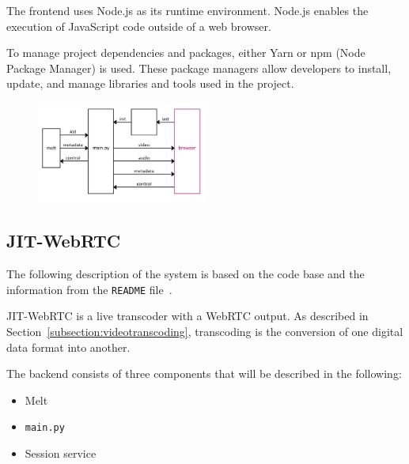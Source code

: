 \documentclass[12pt,a4paper]{article}
\begin{document}
The frontend uses Node.js as its runtime environment. Node.js enables the execution of JavaScript code outside of a web browser.~\cite{nodejs, RM_Frontend, ap3_docs}

To manage project dependencies and packages, either Yarn or npm (Node Package Manager) is used. These package managers allow developers to install, update, and manage libraries and tools used in the project.~\cite{RM_Frontend, npmyarn}


\begin{figure}[H]
	\centering
	\includegraphics[width=0.5\textwidth]{IM_FE.png}
\end{figure}













\subsection{JIT-WebRTC} \label{subsection:jit-webrtc}

The following description of the system is based on the code base and the information from the \texttt{README} file~\cite{RM_Backend}.

JIT-WebRTC is a live transcoder with a WebRTC output. As described in Section~\ref{subsection:videotranscoding}, transcoding is the conversion of one digital data format into another.~\cite{transcoding}

%
%

The backend consists of three components that will be described in the following:
\begin{itemize}
	\item Melt
	\item \texttt{main.py}
	\item Session service
\end{itemize}
\end{document}
